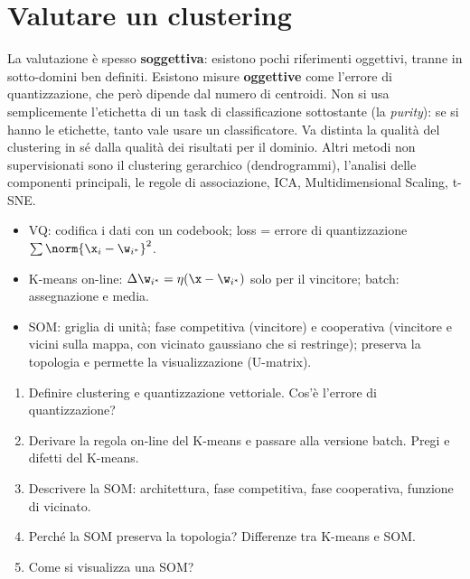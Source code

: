 \section{Valutare un clustering}

La valutazione è spesso \textbf{soggettiva}: esistono pochi riferimenti oggettivi, tranne in sotto-domini ben
definiti. Esistono misure \textbf{oggettive} come l'errore di quantizzazione, che però dipende dal numero di
centroidi. Non si usa semplicemente l'etichetta di un task di classificazione sottostante (la \emph{purity}): se si
hanno le etichette, tanto vale usare un classificatore. Va distinta la qualità del clustering in sé dalla qualità
dei risultati per il dominio. Altri metodi non supervisionati sono il clustering gerarchico (dendrogrammi),
l'analisi delle componenti principali, le regole di associazione, ICA, Multidimensional Scaling, t-SNE.

\begin{puntichiave}
\begin{itemize}
  \item VQ: codifica i dati con un codebook; loss = errore di quantizzazione $\sum\norm{\x_i-\w_{i^*}}^2$.
  \item K-means on-line: $\Delta\w_{i^*} = \eta(\x-\w_{i^*})$ solo per il vincitore; batch: assegnazione e media.
  \item SOM: griglia di unità; fase competitiva (vincitore) e cooperativa (vincitore e vicini sulla mappa, con vicinato
        gaussiano che si restringe); preserva la topologia e permette la visualizzazione (U-matrix).
\end{itemize}
\end{puntichiave}

\begin{domande}
\begin{enumerate}
  \item Definire clustering e quantizzazione vettoriale. Cos'è l'errore di quantizzazione?
  \item Derivare la regola on-line del K-means e passare alla versione batch. Pregi e difetti del K-means.
  \item Descrivere la SOM: architettura, fase competitiva, fase cooperativa, funzione di vicinato.
  \item Perché la SOM preserva la topologia? Differenze tra K-means e SOM.
  \item Come si visualizza una SOM?
\end{enumerate}
\end{domande}

